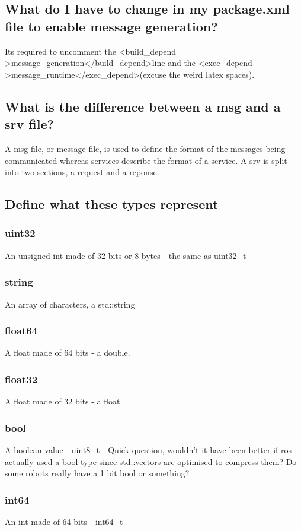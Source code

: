 \documentclass{article}
\begin{document}
\subsection{What do I have to change in my package.xml file to enable message generation?}
Its required to uncomment the \textless build\_depend \textgreater message\_generation\textless/build\_depend\textgreater line and the \textless exec\_depend \textgreater message\_runtime\textless /exec\_depend\textgreater (excuse the weird latex spaces).
\subsection{What is the difference between a msg and a srv file?}
A msg file, or message file, is used to define the format of the messages being communicated whereas services 
describe the format of a service. A srv is split into two sections, a request and a reponse.

\subsection{Define what these types represent}
\subsubsection{uint32}
An unsigned int made of 32 bits or 8 bytes - the same as uint32\_t
\subsubsection{string}
An array of characters, a std::string
\subsubsection{float64}
A float made of 64 bits - a double.
\subsubsection{float32}
A float made of 32 bits - a float.
\subsubsection{bool}
A boolean value - uint8\_t - Quick question, wouldn't it have been better if ros actually used a bool type since std::vectors 
are optimised to compress them? Do some robots really have a 1 bit bool or something?
\subsubsection{int64}
An int made of 64 bits - int64\_t
\end{document}
